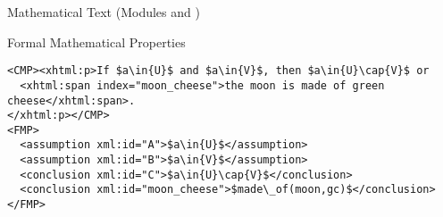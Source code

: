 \begin{tchapter}[id=mtxt,short=Mathematical Text]{Mathematical Text (Modules
  {} and {})}
\begin{tsection}[id=FMP]{Formal Mathematical Properties}
\begin{lstlisting}[mathescape,label=lst:sequent,
  caption={Representing Vernacular as an {\element{FMP}} Sequent},
  index={trl,xml:lang,CMP,FMP,OMOBJ}]
<CMP><xhtml:p>If $a\in{U}$ and $a\in{V}$, then $a\in{U}\cap{V}$ or 
  <xhtml:span index="moon_cheese">the moon is made of green cheese</xhtml:span>.
</xhtml:p></CMP>
<FMP>
  <assumption xml:id="A">$a\in{U}$</assumption>
  <assumption xml:id="B">$a\in{V}$</assumption>
  <conclusion xml:id="C">$a\in{U}\cap{V}$</conclusion>
  <conclusion xml:id="moon_cheese">$made\_of(moon,gc)$</conclusion>
</FMP>
\end{lstlisting}
\end{tsection}



\end{tchapter}

